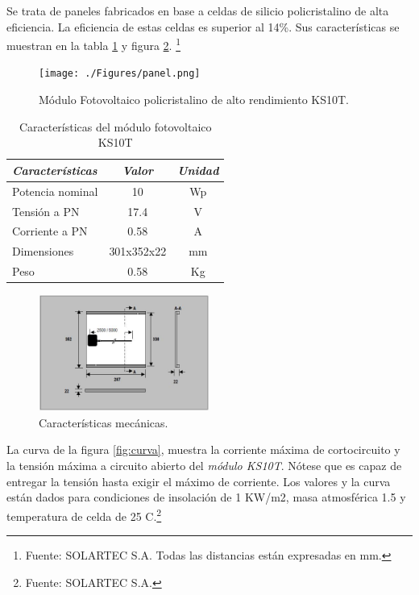 Se trata de paneles fabricados en base a celdas de silicio policristalino de alta eficiencia. La eficiencia de estas celdas es superior al 14\%. Sus características se muestran en la tabla \ref{tab:ks10t} y figura \ref{fig:mecanicas}. \footnote{Fuente: SOLARTEC S.A. Todas las distancias están expresadas en mm.}

 \begin{figure}[h!]
	\centering
    \texttt{[image: ./Figures/panel.png]}
    	\caption{Módulo Fotovoltaico policristalino de alto rendimiento KS10T.}
	\label{fig:ks10t}
\end{figure}

\vspace{10px}

\begin{table}[ht]
	\centering
	\caption{Características del módulo fotovoltaico KS10T}
	\begin{tabular}{@{} l *2c @{}}    \toprule
		\emph{\textbf{Características}} & \emph{\textbf{Valor}} & \emph{\textbf{Unidad}}\\
		\midrule
		Potencia nominal	& 10 	& Wp	\\	
		Tensión a PN		& 17.4	& V\\
		Corriente a PN	& 0.58		& A\\
		Dimensiones		& 301x352x22 	& mm\\
		Peso				& 0.58		& Kg	\\
		\bottomrule
		\hline
	\end{tabular}
	\label{tab:ks10t}
\end{table}

\begin{figure}[h!]
	\centering
    \includegraphics[width=0.5\textwidth]{./Figures/mecanicas.JPG}
    	\caption{Características mecánicas.}
	\label{fig:mecanicas}
\end{figure}

La curva de la figura \ref{fig:curva}, muestra la corriente máxima de cortocircuito y la tensión máxima a circuito abierto del \textit{módulo KS10T}. Nótese que es capaz de entregar la tensión hasta exigir el máximo de corriente. Los valores y la curva están dados para condiciones de insolación de 1 KW/m2, masa atmosférica 1.5 y temperatura de celda de 25 \grados C.\footnote{Fuente: SOLARTEC S.A.}

